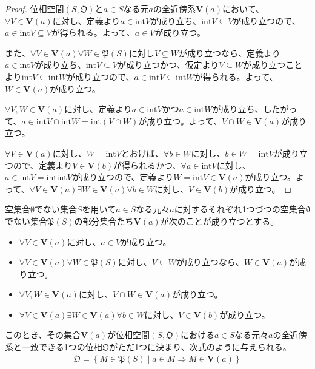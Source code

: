 \documentclass[dvipdfmx]{jsarticle}
\begin{document}
\begin{proof}
位相空間$\left( S,\mathfrak{O} \right)$と$a \in S$なる元$a$の全近傍系$\mathbf{V}(a)$において、$\forall V \in \mathbf{V}(a)$に対し、定義より$a \in {\mathrm{int}}V$が成り立ち、${\mathrm{int}}V \subseteq V$が成り立つので、$a \in {\mathrm{int}}V \subseteq V$が得られる。よって、$a \in V$が成り立つ。\par
また、$\forall V \in \mathbf{V}(a)\forall W \in \mathfrak{P}(S)$に対し$V \subseteq W$が成り立つなら、定義より$a \in {\mathrm{int}}V$が成り立ち、${\mathrm{int}}V \subseteq V$が成り立つかつ、仮定より$V \subseteq W$が成り立つことより${\mathrm{int}}V \subseteq {\mathrm{int}}W$が成り立つので、$a \in {\mathrm{int}}V \subseteq {\mathrm{int}}W$が得られる。よって、$W \in \mathbf{V}(a)$が成り立つ。\par
$\forall V,W \in \mathbf{V}(a)$に対し、定義より$a \in {\mathrm{int}}V$かつ$a \in {\mathrm{int}}W$が成り立ち、したがって、$a \in {\mathrm{int}}V \cap {\mathrm{int}}W = {\mathrm{int}}(V \cap W)$が成り立つ。よって、$V \cap W \in \mathbf{V}(a)$が成り立つ。\par
$\forall V \in \mathbf{V}(a)$に対し、$W = {\mathrm{int}}V$とおけば、$\forall b \in W$に対し、$b \in W = {\mathrm{int}}V$が成り立つので、定義より$V \in \mathbf{V}(b)$が得られるかつ、$\forall a \in {\mathrm{int}}V$に対し、$a \in {\mathrm{int}}V = {\mathrm{int}}{{\mathrm{int}}V}$が成り立つので、定義より$W = {\mathrm{int}}V \in \mathbf{V}(a)$が成り立つ。よって、$\forall V \in \mathbf{V}(a)\exists W \in \mathbf{V}(a)\forall b \in W$に対し、$V \in \mathbf{V}(b)$が成り立つ。
\end{proof}
\begin{thm}\label{8.1.1.25}
空集合$\emptyset$でない集合$S$を用いて$a \in S$なる元々$a$に対するそれぞれ1つづつの空集合$\emptyset$でない集合$\mathfrak{P}(S)$の部分集合たち$\mathbf{V}(a)$が次のことが成り立つとする。
\begin{itemize}
\item
  $\forall V \in \mathbf{V}(a)$に対し、$a \in V$が成り立つ。
\item
  $\forall V \in \mathbf{V}(a)\forall W \in \mathfrak{P}(S)$に対し、$V \subseteq W$が成り立つなら、$W \in \mathbf{V}(a)$が成り立つ。
\item
  $\forall V,W \in \mathbf{V}(a)$に対し、$V \cap W \in \mathbf{V}(a)$が成り立つ。
\item
  $\forall V \in \mathbf{V}(a)\exists W \in \mathbf{V}(a)\forall b \in W$に対し、$V \in \mathbf{V}(b)$が成り立つ。
\end{itemize}
このとき、その集合$\mathbf{V}(a)$が位相空間$\left( S,\mathfrak{O} \right)$における$a \in S$なる元々$a$の全近傍系と一致できる1つの位相$\mathfrak{O}$がただ1つに決まり、次式のように与えられる。
\begin{align*}
\mathfrak{O}=\left\{ M \in \mathfrak{P}(S) \middle| a \in M \Rightarrow M \in \mathbf{V}(a) \right\}
\end{align*}
\end{thm}\par
\end{document}
